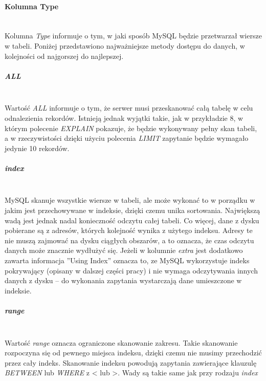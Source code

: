 \paragraph{Kolumna Type}\leavevmode\\
Kolumna \textit{Type} informuje o tym, w jaki sposób MySQL będzie przetwarzał wiersze w tabeli. Poniżej przedstawiono najważniejsze metody dostępu do danych, w kolejności od najgorszej do najlepszej.

\subparagraph{ALL}\leavevmode\\
Wartość \textit{ALL} informuje o tym, że serwer musi przeskanować całą tabelę w celu odnalezienia rekordów. Istnieją jednak wyjątki takie, jak w przykładzie 8, w którym polecenie \textit{EXPLAIN} pokazuje, że będzie wykonywany pełny skan tabeli, a w rzeczywistości dzięki użyciu polecenia \textit{LIMIT} zapytanie będzie wymagało jedynie 10 rekordów.

\subparagraph{index}\leavevmode\\
MySQL skanuje wszystkie wiersze w tabeli, ale może wykonać to w porządku w jakim jest przechowywane w indeksie, dzięki czemu unika sortowania. Największą wadą jest jednak nadal konieczność odczytu całej tabeli. Co więcej, dane z dysku pobierane są z adresów, których kolejność wynika z użytego indeksu. Adresy te nie muszą zajmować na dysku ciągłych obszarów, a to oznacza, że czas odczytu danych może znacznie wydłużyć się. Jeżeli w kolumnie \textit{extra} jest dodatkowo zawarta informacja ''Using Index'' oznacza to, ze MySQL wykorzystuje indeks pokrywający (opisany w dalszej części pracy) i nie wymaga odczytywania innych danych z dysku – do wykonania zapytania wystarczają dane umieszczone w indeksie.

\subparagraph{range}\leavevmode\\
Wartość \textit{range} oznacza ograniczone skanowanie zakresu. Takie skanowanie rozpoczyna się od pewnego miejsca indeksu, dzięki czemu nie musimy przechodzić przez cały indeks. Skanowanie indeksu powodują zapytania zawierające klauzulę \textit{BETWEEN} lub \textit{WHERE} z < lub >. Wady są takie same jak przy rodzaju \textit{index}

